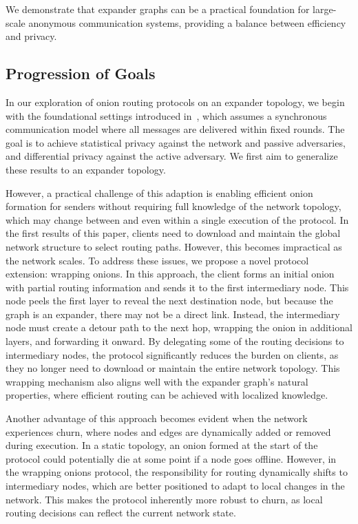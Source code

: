 We demonstrate that expander graphs can be a practical foundation for large-scale anonymous communication systems, providing a balance between efficiency and privacy.

\subsection{Progression of Goals}

In our exploration of onion routing protocols on an expander topology, we begin with the foundational settings introduced in~\cite{ICALP:AndLysUpf18}, which assumes a synchronous communication model where all messages are delivered within fixed rounds. The goal is to achieve statistical privacy against the network and passive adversaries, and differential privacy against the active adversary. We first aim to generalize these results to an expander topology. 

However, a practical challenge of this adaption is enabling efficient onion formation for senders without requiring full knowledge of the network topology, which may change between and even within a single execution of the protocol. In the first results of this paper, clients need to download and maintain the global network structure to select routing paths. However, this becomes impractical as the network scales. To address these issues, we propose a novel protocol extension: wrapping onions. In this approach, the client forms an initial onion with partial routing information and sends it to the first intermediary node. This node peels the first layer to reveal the next destination node, but because the graph is an expander, there may not be a direct link. Instead, the intermediary node must create a detour path to the next hop, wrapping the onion in additional layers, and forwarding it onward. By delegating some of the routing decisions to intermediary nodes, the protocol significantly reduces the burden on clients, as they no longer need to download or maintain the entire network topology. This wrapping mechanism also aligns well with the expander graph's natural properties, where efficient routing can be achieved with localized knowledge.

Another advantage of this approach becomes evident when the network experiences churn, where nodes and edges are dynamically added or removed during execution. In a static topology, an onion formed at the start of the protocol could potentially die at some point if a node goes offline. However, in the wrapping onions protocol, the responsibility for routing dynamically shifts to intermediary nodes, which are better positioned to adapt to local changes in the network. This makes the protocol inherently more robust to churn, as local routing decisions can reflect the current network state.

